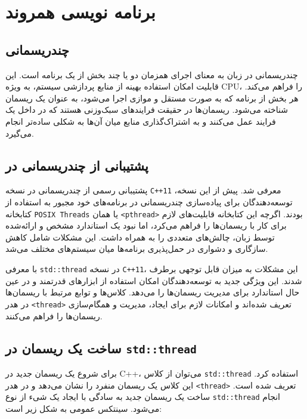 \documentclass[12pt, a4paper]{report}
\begin{document}
\chapter{برنامه نویسی همروند}

\section{چندریسمانی}

چندریسمانی در زبان  به معنای اجرای همزمان دو یا چند بخش از یک برنامه است. این قابلیت امکان استفاده بهینه از منابع پردازشی سیستم، به ویژه CPU، را فراهم می‌کند. هر بخش از برنامه که به صورت مستقل و موازی اجرا می‌شود، به عنوان یک ریسمان شناخته می‌شود. ریسمان‌ها در حقیقت فرایندهای سبک‌وزنی هستند که در داخل یک فرایند عمل می‌کنند و به اشتراک‌گذاری منابع میان آن‌ها به شکلی ساده‌تر انجام می‌گیرد.

\section{پشتیبانی از چندریسمانی در }

پشتیبانی رسمی از چندریسمانی در نسخه \texttt{C++11} معرفی شد. پیش از این نسخه، توسعه‌دهندگان برای پیاده‌سازی چندریسمانی در برنامه‌های خود مجبور به استفاده از کتابخانه \texttt{POSIX Threads} یا همان \texttt{<pthread>} بودند. اگرچه این کتابخانه قابلیت‌های لازم برای کار با ریسمان‌ها را فراهم می‌کرد، اما نبود یک استاندارد مشخص و ارائه‌شده توسط زبان، چالش‌های متعددی را به همراه داشت. این مشکلات شامل کاهش سازگاری و دشواری در حمل‌پذیری برنامه‌ها میان سیستم‌های مختلف می‌شد.

با معرفی \texttt{std::thread} در نسخه \texttt{C++11}، این مشکلات به میزان قابل توجهی برطرف شدند. این ویژگی جدید به توسعه‌دهندگان امکان استفاده از ابزارهای قدرتمند و در عین حال استاندارد برای مدیریت ریسمان‌ها را می‌دهد. کلاس‌ها و توابع مرتبط با ریسمان‌ها در هدر \texttt{<thread>} تعریف شده‌اند و امکانات لازم برای ایجاد، مدیریت و همگام‌سازی ریسمان‌ها را فراهم می‌کنند.

\section{ساخت یک ریسمان در \texttt{std::thread}}

برای شروع یک ریسمان جدید در C++، می‌توان از کلاس \texttt{std::thread} استفاده کرد. این کلاس یک ریسمان منفرد را نشان می‌دهد و در هدر \texttt{<thread>} تعریف شده است. ساخت یک ریسمان جدید به سادگی با ایجاد یک شیء از نوع \texttt{std::thread} انجام می‌شود. سینتکس عمومی به شکل زیر است:
\end{document}

